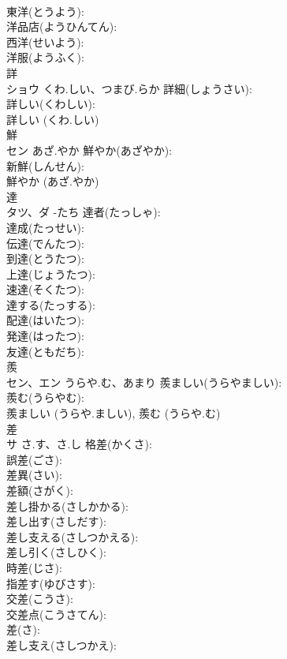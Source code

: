 \documentclass[8pt]{extreport}
\begin{document}
\begin{CJK}{UTF8}{min}
\\	東洋(とうよう): 
\\	洋品店(ようひんてん): 
\\	西洋(せいよう): 
\\	洋服(ようふく): 
\\	詳			
\\	ショウ	くわ.しい、つまび.らか	詳細(しょうさい): 
\\	詳しい(くわしい): 
\\	詳しい (くわ.しい)
\\	鮮			
\\	セン	あざ.やか	鮮やか(あざやか): 
\\	新鮮(しんせん): 
\\	鮮やか (あざ.やか)
\\	達			
\\	タツ、ダ	-たち	達者(たっしゃ): 
\\	達成(たっせい): 
\\	伝達(でんたつ): 
\\	到達(とうたつ): 
\\	上達(じょうたつ): 
\\	速達(そくたつ): 
\\	達する(たっする): 
\\	配達(はいたつ): 
\\	発達(はったつ): 
\\	友達(ともだち): 
\\	羨			
\\	セン、エン	うらや.む、あまり	羨ましい(うらやましい): 
\\	羨む(うらやむ): 
\\	羨ましい (うらや.ましい), 羨む (うらや.む)
\\	差			
\\	サ	さ.す、さ.し	格差(かくさ): 
\\	誤差(ごさ): 
\\	差異(さい): 
\\	差額(さがく): 
\\	差し掛かる(さしかかる): 
\\	差し出す(さしだす): 
\\	差し支える(さしつかえる): 
\\	差し引く(さしひく): 
\\	時差(じさ): 
\\	指差す(ゆびさす): 
\\	交差(こうさ): 
\\	交差点(こうさてん): 
\\	差(さ): 
\\	差し支え(さしつかえ): 

\end{CJK}
\end{document}
